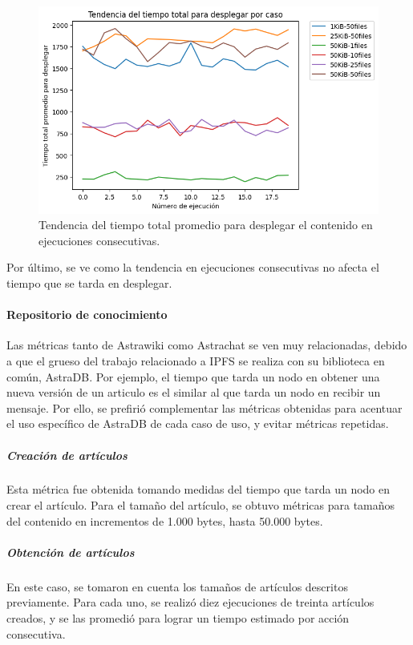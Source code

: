 \begin{figure}[H]
    \centering
    \includegraphics[width=0.9\linewidth]{img/metricas-ipfs/tendencia-desplegar.png}
    \caption{Tendencia del tiempo total promedio para desplegar el contenido en ejecuciones consecutivas.}
    \label{fig:tendencia-desplegar.png}
\end{figure}

Por último, se ve como la tendencia en ejecuciones consecutivas no afecta el tiempo que se tarda en desplegar.

\paragraph{Repositorio de conocimiento}

Las métricas tanto de Astrawiki como Astrachat se ven muy relacionadas, debido a que el grueso del trabajo relacionado a IPFS se realiza con su biblioteca en común, AstraDB. Por ejemplo, el tiempo que tarda un nodo en obtener una nueva versión de un articulo es el similar al que tarda un nodo en recibir un mensaje. Por ello, se prefirió complementar las métricas obtenidas para acentuar el uso específico de AstraDB de cada caso de uso, y evitar métricas repetidas. 

\subparagraph{Creación de artículos}

Esta métrica fue obtenida tomando medidas del tiempo que tarda un nodo en crear el artículo. Para el tamaño del artículo, se obtuvo métricas para tamaños del contenido en incrementos de 1.000 bytes, hasta 50.000 bytes.

\subparagraph{Obtención de artículos}

En este caso, se tomaron en cuenta los tamaños de artículos descritos previamente. Para cada uno, se realizó diez ejecuciones de treinta artículos creados, y se las promedió para lograr un tiempo estimado por acción consecutiva.

